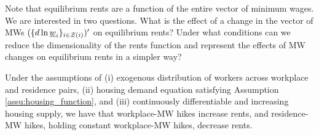 Note that equilibrium rents are a function of the entire vector of minimum wages. 
We are interested in two questions.
What is the effect of a change in the vector of MWs $(\{d \ln \underline{w}_i\}_{i\in\mathcal{Z}(i)})'$
on equilibrium rents?
Under what conditions can we reduce the dimensionality of the rents function and 
represent the effects of MW changes on equilibrium rents in a simpler way?

\begin{prop}\label{prop:comparative_statics}
    Under the assumptions of
    (i) exogenous distribution of workers across workplace and residence pairs, 
    (ii) housing demand equation satisfying Assumption \ref{assu:housing_function}, 
    and 
    (iii) continuously differentiable and increasing housing supply, we have that
    workplace-MW hikes increase rents, and residence-MW hikes, holding constant 
    workplace-MW hikes, decrease rents.
\end{prop}

